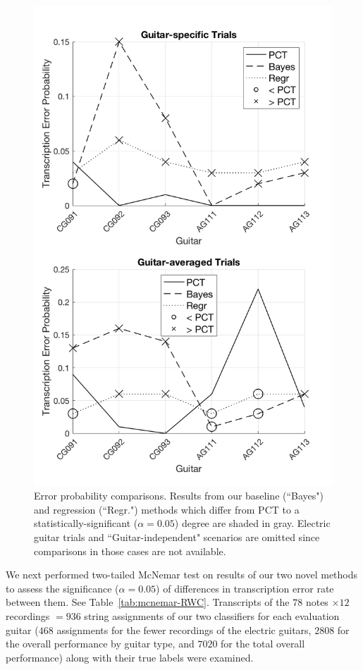 \documentclass[convention,peer-reviewed]{aesconf}
\begin{document}
\begin{figure}[!htbp]
\centering
\includegraphics[scale=0.25]{sig-comp-PCT}
\caption{Error probability comparisons. Results from our baseline (``Bayes") and regression (``Regr.") methods which differ from PCT to a statistically-significant ($\alpha=0.05$) degree are shaded in gray. Electric guitar trials and ``Guitar-independent" scenarios are omitted since comparisons in those cases are not available.}
\label{tab:ttest-RWC}
\end{figure}

We next performed two-tailed McNemar test on results of our two novel methods to assess the significance ($\alpha = 0.05$) of differences in transcription error rate between them. See Table~\ref{tab:mcnemar-RWC}. Transcripts of the $78$ notes $\times 12$ recordings $= 936$ string assignments of our two classifiers for each evaluation guitar ($468$ assignments for the fewer recordings of the electric guitars, $2808$ for the overall performance by guitar type, and $7020$ for the total overall performance) along with their true labels were examined.
\end{document}
